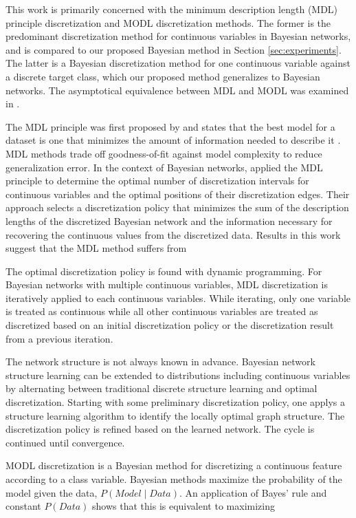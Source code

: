 This work is primarily concerned with the minimum description length (MDL) principle discretization \citep{Friedman_1996} and MODL discretization \citep{Boulle_2006} methods.
The former is the predominant discretization method for continuous variables in Bayesian networks, and is compared to our proposed Bayesian method in Section \ref{sec:experiments}.
The latter is a Bayesian discretization method for one continuous variable against a discrete target class, which our proposed method generalizes to Bayesian networks.
The asymptotical equivalence between MDL and MODL was examined in \citep{VL_2000}.

The MDL principle was first proposed by \cite{MDL_1978} and states that the best model for a dataset is one that minimizes the amount of information needed to describe it \citep{Grunwald_2009}.
MDL methods trade off goodness-of-fit against model complexity to reduce generalization error.
In the context of Bayesian networks, \cite{Friedman_1996} applied the MDL principle to determine the optimal number of discretization intervals for continuous variables and the optimal positions of their discretization edges.
Their approach selects a discretization policy that minimizes the sum of the description lengths of the discretized Bayesian network and the information necessary for recovering the continuous values from the discretized data.
Results in this work suggest that the MDL method suffers from 

The optimal discretization policy is found with dynamic programming.
For Bayesian networks with multiple continuous variables, MDL discretization is iteratively applied to each continuous variables.
While iterating, only one variable is treated as continuous while all other continuous variables are treated as discretized based on an initial discretization policy or the discretization result from a previous iteration.

The network structure is not always known in advance.
Bayesian network structure learning can be extended to distributions including continuous variables by alternating between traditional discrete structure learning and optimal discretization.
Starting with some preliminary discretization policy, one applys a structure learning algorithm to identify the locally optimal graph structure.
The discretization policy is refined based on the learned network.
The cycle is continued until convergence.

MODL discretization \citep{Boulle_2006} is a Bayesian method for discretizing a continuous feature according to a class variable.
Bayesian methods maximize the probability of the model given the data, $P(\textit{Model} \mid \textit{Data})$.
An application of Bayes' rule and constant $P(\textit{Data})$ shows that this is equivalent to maximizing

